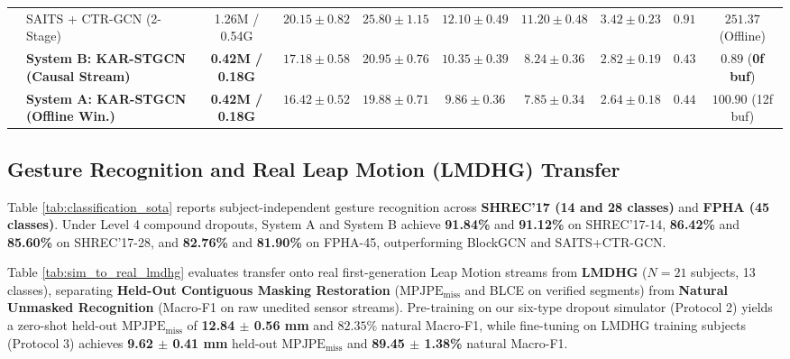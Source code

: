 \documentclass[10pt,twocolumn]{article}
\begin{document}
\begin{table}[!t]
{\begin{tabular}{llcccccccc}
 & SAITS + CTR-GCN (2-Stage) & 1.26M / 0.54G & $20.15 \pm 0.82$ & $25.80 \pm 1.15$ & $12.10 \pm 0.49$ & $11.20 \pm 0.48$ & $3.42 \pm 0.23$ & $0.91$ & $251.37$ (Offline) \\
 & \textbf{System B: KAR-STGCN (Causal Stream)} & \textbf{0.42M / 0.18G} & $17.18 \pm 0.58$ & $20.95 \pm 0.76$ & $10.35 \pm 0.39$ & $8.24 \pm 0.36$ & $2.82 \pm 0.19$ & $0.43$ & $\mathbf{0.89}$ (\textbf{0f buf}) \\
 & \textbf{System A: KAR-STGCN (Offline Win.)} & \textbf{0.42M / 0.18G} & $\mathbf{16.42 \pm 0.52}$ & $\mathbf{19.88 \pm 0.71}$ & $\mathbf{9.86 \pm 0.36}$ & $\mathbf{7.85 \pm 0.34}$ & $\mathbf{2.64 \pm 0.18}$ & $0.44$ & $100.90$ (12f buf) \\
\bottomrule
\end{tabular}%
}
\end{table}

\subsection{Gesture Recognition and Real Leap Motion (LMDHG) Transfer}
Table \ref{tab:classification_sota} reports subject-independent gesture recognition across \textbf{SHREC'17 (14 and 28 classes)} and \textbf{FPHA (45 classes)}. Under Level 4 compound dropouts, System A and System B achieve \textbf{91.84\%} and \textbf{91.12\%} on SHREC'17-14, \textbf{86.42\%} and \textbf{85.60\%} on SHREC'17-28, and \textbf{82.76\%} and \textbf{81.90\%} on FPHA-45, outperforming BlockGCN \cite{zhou2024blockgcn} and SAITS+CTR-GCN.

Table \ref{tab:sim_to_real_lmdhg} evaluates transfer onto real first-generation Leap Motion streams from \textbf{LMDHG} \cite{boulahia2017dynamic} ($N=21$ subjects, 13 classes), separating \textbf{Held-Out Contiguous Masking Restoration} ($\text{MPJPE}_{\text{miss}}$ and BLCE on verified segments) from \textbf{Natural Unmasked Recognition} (Macro-F1 on raw unedited sensor streams). Pre-training on our six-type dropout simulator (Protocol 2) yields a zero-shot held-out $\text{MPJPE}_{\text{miss}}$ of \textbf{12.84 $\pm$ 0.56 mm} and $82.35\%$ natural Macro-F1, while fine-tuning on LMDHG training subjects (Protocol 3) achieves \textbf{9.62 $\pm$ 0.41 mm} held-out $\text{MPJPE}_{\text{miss}}$ and \textbf{89.45 $\pm$ 1.38\%} natural Macro-F1.
\end{document}
